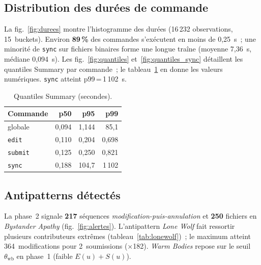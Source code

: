 \documentclass[conference]{IEEEtran}
\begin{document}
\figActivite

\figHuitRush

\subsection{Distribution des durées de commande}
La fig.~\ref{fig:durees} montre l'histogramme des durées (16\,232
observations, 15~buckets). Environ \textbf{89\,\%} des commandes
s'exécutent en moins de 0,25~s~; une minorité de \texttt{sync} sur
fichiers binaires forme une longue traîne (moyenne 7,36~s, médiane
0,094~s). Les fig.~\ref{fig:quantiles} et~\ref{fig:quantiles_sync}
détaillent les quantiles Summary par commande~; le
tableau~\ref{tab:quantiles} en donne les valeurs numériques.
\texttt{sync} atteint p99\,=\,1\,102~s.

\figQuatreHistogramme

\begin{table}[!t]
  \caption{Quantiles Summary (secondes).}
  \label{tab:quantiles}
  \centering
  \scriptsize
  \begin{tabularx}{\linewidth}{@{}Xrrr@{}}
    \toprule
    \textbf{Commande} & \textbf{p50} & \textbf{p95} & \textbf{p99} \\
    \midrule
    globale & 0,094 & 1,144 & 85,1 \\
    \texttt{edit} & 0,110 & 0,204 & 0,698 \\
    \texttt{submit} & 0,125 & 0,250 & 0,821 \\
    \texttt{sync} & 0,188 & 104,7 & 1\,102 \\
    \bottomrule
  \end{tabularx}
\end{table}

\figQuantilesCombine

\subsection{Antipatterns détectés}
La phase~2 signale \textbf{217} séquences
\emph{modification-puis-annulation} et \textbf{250} fichiers en
\emph{Bystander Apathy} (fig.~\ref{fig:alertes}). L'antipattern
\emph{Lone Wolf} fait ressortir plusieurs contributeurs extrêmes
(tableau~\ref{tab:lonewolf})~; le maximum atteint 364~modifications pour
2~soumissions ($\times$182). \emph{Warm Bodies} repose sur le seuil
$\theta_{\mathrm{wb}}$ en phase~1 (faible $E(u){+}S(u)$).

\figSeptAlertes
\end{document}
